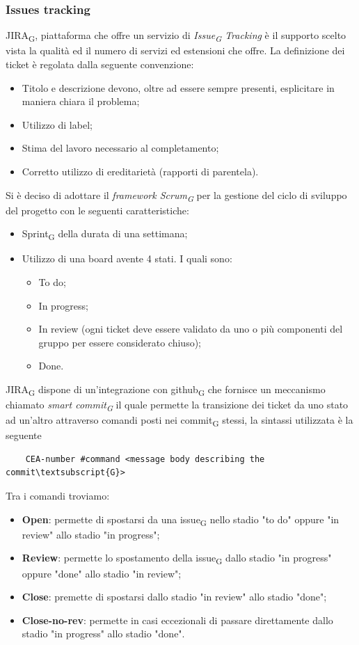 	\subsubsection{Issues tracking}
	JIRA\textsubscript{G}, piattaforma che offre un servizio di \textit{Issue\textsubscript{G} Tracking} è il supporto scelto vista la qualità ed il numero di servizi ed estensioni che offre.
	\newline
	La definizione dei ticket è regolata dalla seguente convenzione:
	\begin{itemize}
		\item Titolo e descrizione devono, oltre ad essere sempre presenti, esplicitare in maniera chiara il problema;
		\item Utilizzo di label;
		\item Stima del lavoro necessario al completamento;
		\item Corretto utilizzo di ereditarietà (rapporti di parentela).
	\end{itemize}
	Si è deciso di adottare il \textit{framework Scrum\textsubscript{G}} per la gestione del ciclo di sviluppo del progetto con le seguenti caratteristiche:
	\begin{itemize}
		\item Sprint\textsubscript{G} della durata di una settimana;
		\item Utilizzo di una board avente 4 stati.
		I quali sono:
		\begin{itemize}
			\item To do;
			\item In progress;
			\item In review (ogni ticket deve essere validato da uno o più componenti del gruppo per essere considerato chiuso);
			\item Done.
		\end{itemize}
	\end{itemize}

	JIRA\textsubscript{G} dispone di un'integrazione con github\textsubscript{G} che fornisce un meccanismo chiamato \textit{smart commit\textsubscript{G}} il quale permette la transizione dei ticket da uno stato ad un'altro attraverso comandi posti nei commit\textsubscript{G} stessi, la sintassi utilizzata è la seguente
	\begin{lstlisting}
	CEA-number #command <message body describing the commit\textsubscript{G}>
	\end{lstlisting}
	Tra i comandi troviamo:
	\begin{itemize}
		\item \textbf{Open}: permette di spostarsi da una issue\textsubscript{G} nello stadio "to do" oppure "in review" allo stadio "in progress";
		\item \textbf{Review}: permette lo spostamento della issue\textsubscript{G} dallo stadio "in progress" oppure "done" allo stadio "in review";
		\item \textbf{Close}: premette di spostarsi dallo stadio "in review" allo stadio "done";
		\item \textbf{Close-no-rev}: permette in casi eccezionali di passare direttamente dallo stadio "in progress" allo stadio "done".
	\end{itemize}
	
